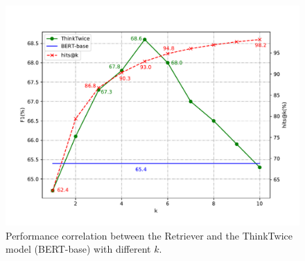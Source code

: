 \begin{figure}
    \centering
    \includegraphics[scale=1.0]{figure/3-2.pdf}
    \caption{Performance correlation between the Retriever and the ThinkTwice model (BERT-base) with different $k$.}
    \label{fig:3_2}
\end{figure}

